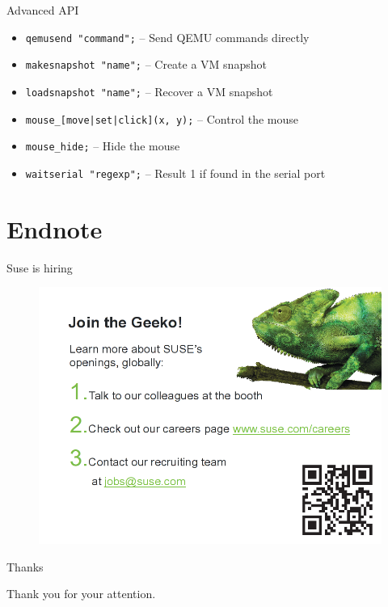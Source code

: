 \documentclass{beamer}
\begin{document}
\begin{frame}{Advanced API}
  \begin{itemize}
  \item \texttt{qemusend "command";} -- Send QEMU commands directly
  \item \texttt{makesnapshot "name";} -- Create a VM snapshot
  \item \texttt{loadsnapshot "name";} -- Recover a VM snapshot
  \item \texttt{mouse\_[move|set|click](x, y);} -- Control the mouse
  \item \texttt{mouse\_hide;} -- Hide the mouse
  \item \texttt{waitserial "regexp";} -- Result 1 if found in the serial port
  \end{itemize}
\end{frame}


\section{Endnote}

\begin{frame}{Suse is hiring}
  \begin{figure}
    \includegraphics[width= 0.8\linewidth]{suse_hiring.png}
  \end{figure}
\end{frame}

\begin{frame}{Thanks}
  \begin{center}
    Thank you for your attention.
  \end{center}
\end{frame}
\end{document}
